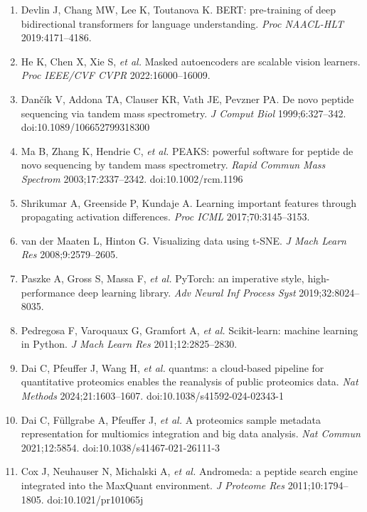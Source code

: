 \documentclass[
]{article}
\begin{document}
\begin{enumerate}
  Gorishniy Y, Rubachev I, Khrulkov V, Babenko A. Revisiting deep
  learning models for tabular data. \emph{Adv Neural Inf Process Syst}
  2021;34:18932--18943.
\item
  Devlin J, Chang MW, Lee K, Toutanova K. BERT: pre-training of deep
  bidirectional transformers for language understanding. \emph{Proc
  NAACL-HLT} 2019:4171--4186.
\item
  He K, Chen X, Xie S, \emph{et al.} Masked autoencoders are scalable
  vision learners. \emph{Proc IEEE/CVF CVPR} 2022:16000--16009.
\item
  Dančík V, Addona TA, Clauser KR, Vath JE, Pevzner PA. De novo peptide
  sequencing via tandem mass spectrometry. \emph{J Comput Biol}
  1999;6:327--342. doi:10.1089/106652799318300
\item
  Ma B, Zhang K, Hendrie C, \emph{et al.} PEAKS: powerful software for
  peptide de novo sequencing by tandem mass spectrometry. \emph{Rapid
  Commun Mass Spectrom} 2003;17:2337--2342. doi:10.1002/rcm.1196
\item
  Shrikumar A, Greenside P, Kundaje A. Learning important features
  through propagating activation differences. \emph{Proc ICML}
  2017;70:3145--3153.
\item
  van der Maaten L, Hinton G. Visualizing data using t-SNE. \emph{J Mach
  Learn Res} 2008;9:2579--2605.
\item
  Paszke A, Gross S, Massa F, \emph{et al.} PyTorch: an imperative
  style, high-performance deep learning library. \emph{Adv Neural Inf
  Process Syst} 2019;32:8024--8035.
\item
  Pedregosa F, Varoquaux G, Gramfort A, \emph{et al.} Scikit-learn:
  machine learning in Python. \emph{J Mach Learn Res}
  2011;12:2825--2830.
\item
  Dai C, Pfeuffer J, Wang H, \emph{et al.} quantms: a cloud-based
  pipeline for quantitative proteomics enables the reanalysis of public
  proteomics data. \emph{Nat Methods} 2024;21:1603--1607.
  doi:10.1038/s41592-024-02343-1
\item
  Dai C, Füllgrabe A, Pfeuffer J, \emph{et al.} A proteomics sample
  metadata representation for multiomics integration and big data
  analysis. \emph{Nat Commun} 2021;12:5854.
  doi:10.1038/s41467-021-26111-3
\item
  Cox J, Neuhauser N, Michalski A, \emph{et al.} Andromeda: a peptide
  search engine integrated into the MaxQuant environment. \emph{J
  Proteome Res} 2011;10:1794--1805. doi:10.1021/pr101065j
\end{enumerate}
\end{document}

